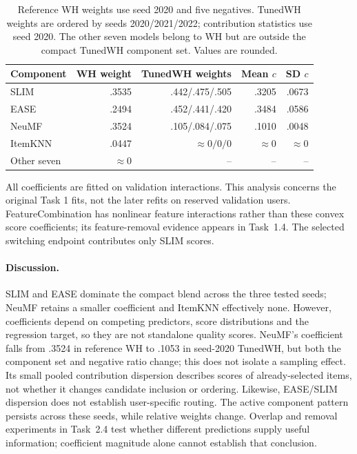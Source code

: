 \documentclass[12pt,a4paper]{article}   %
\begin{document}
\begin{table}[H]
\centering
\begingroup
\setlength{\tabcolsep}{4pt}
\begin{tabular}{@{}lrrrr@{}}
\toprule
Component & WH weight & TunedWH weights & Mean $c$ & SD $c$ \\
\midrule
SLIM & .3535 & .442/.475/.505 & .3205 & .0673 \\
EASE & .2494 & .452/.441/.420 & .3484 & .0586 \\
NeuMF & .3524 & .105/.084/.075 & .1010 & .0048 \\
ItemKNN & .0447 & $\approx0/0/0$ & $\approx0$ & $\approx0$ \\
Other seven & $\approx0$ & -- & -- & -- \\
\bottomrule
\end{tabular}
\endgroup
\caption{Reference WH weights use seed 2020 and five negatives. TunedWH weights are ordered by seeds 2020/2021/2022; contribution statistics use seed 2020. The other seven models belong to WH but are outside the compact TunedWH component set. Values are rounded.}
\label{tab:coef}
\end{table}

All coefficients are fitted on validation interactions. This analysis concerns the original Task 1 fits, not the later refits on reserved validation users. FeatureCombination has nonlinear feature interactions rather than these convex score coefficients; its feature-removal evidence appears in Task~1.4. The selected switching endpoint contributes only SLIM scores.

\paragraph{Discussion.}
SLIM and EASE dominate the compact blend across the three tested seeds; NeuMF retains a smaller coefficient and ItemKNN effectively none. However, coefficients depend on competing predictors, score distributions and the regression target, so they are not standalone quality scores. NeuMF's coefficient falls from .3524 in reference WH to .1053 in seed-2020 TunedWH, but both the component set and negative ratio change; this does not isolate a sampling effect. Its small pooled contribution dispersion describes scores of already-selected items, not whether it changes candidate inclusion or ordering. Likewise, EASE/SLIM dispersion does not establish user-specific routing. The active component pattern persists across these seeds, while relative weights change. Overlap and removal experiments in Task~2.4 test whether different predictions supply useful information; coefficient magnitude alone cannot establish that conclusion.
\end{document}
